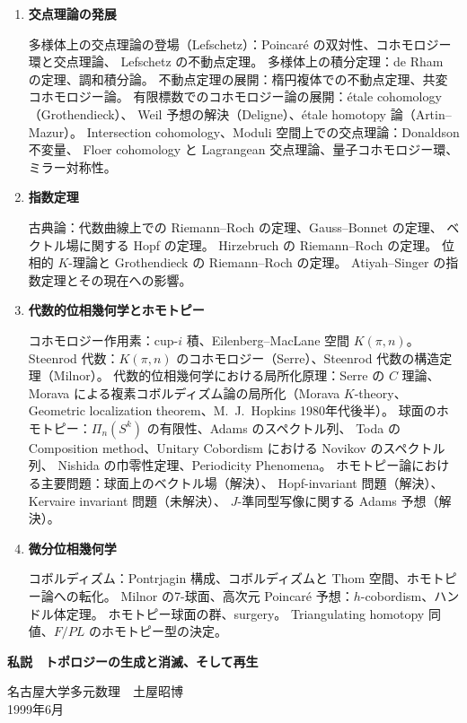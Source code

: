 \documentclass[uplatex,dvipdfmx]{jlreq}
\begin{document}
\begin{enumerate}
  \item \textbf{交点理論の発展}

  多様体上の交点理論の登場（Lefschetz）：Poincaré の双対性、コホモロジー環と交点理論、
  Lefschetz の不動点定理。
  多様体上の積分定理：de Rham の定理、調和積分論。
  不動点定理の展開：楕円複体での不動点定理、共変コホモロジー論。
  有限標数でのコホモロジー論の展開：étale cohomology（Grothendieck）、
  Weil 予想の解決（Deligne）、étale homotopy 論（Artin--Mazur）。
  Intersection cohomology、Moduli 空間上での交点理論：Donaldson 不変量、
  Floer cohomology と Lagrangean 交点理論、量子コホモロジー環、ミラー対称性。

  \item \textbf{指数定理}

  古典論：代数曲線上での Riemann--Roch の定理、Gauss--Bonnet の定理、
  ベクトル場に関する Hopf の定理。
  Hirzebruch の Riemann--Roch の定理。
  位相的 $K$-理論と Grothendieck の Riemann--Roch の定理。
  Atiyah--Singer の指数定理とその現在への影響。

  \item \textbf{代数的位相幾何学とホモトピー}

  コホモロジー作用素：cup-$i$ 積、Eilenberg--MacLane 空間 $K(\pi,n)$。
  Steenrod 代数：$K(\pi,n)$ のコホモロジー（Serre）、Steenrod 代数の構造定理（Milnor）。
  代数的位相幾何学における局所化原理：Serre の $C$ 理論、
  Morava による複素コボルディズム論の局所化（Morava $K$-theory、
  Geometric localization theorem、M.~J.~Hopkins 1980年代後半）。
  球面のホモトピー：$\Pi_n(S^k)$ の有限性、Adams のスペクトル列、
  Toda の Composition method、Unitary Cobordism における Novikov のスペクトル列、
  Nishida の巾零性定理、Periodicity Phenomena。
  ホモトピー論における主要問題：球面上のベクトル場（解決）、
  Hopf-invariant 問題（解決）、Kervaire invariant 問題（未解決）、
  $J$-準同型写像に関する Adams 予想（解決）。

  \item \textbf{微分位相幾何学}

  コボルディズム：Pontrjagin 構成、コボルディズムと Thom 空間、ホモトピー論への転化。
  Milnor の7-球面、高次元 Poincaré 予想：$h$-cobordism、ハンドル体定理。
  ホモトピー球面の群、surgery。
  Triangulating homotopy 同値、$F/PL$ のホモトピー型の決定。
\end{enumerate}

\newpage

\begin{center}
  {\large\bfseries 私説　トポロジーの生成と消滅、そして再生}
\end{center}
\begin{center}
  名古屋大学多元数理　土屋昭博\\
  1999年6月
\end{center}
\end{document}
